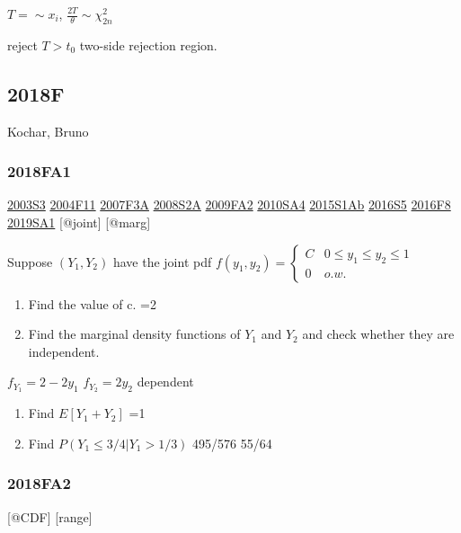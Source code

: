 \documentclass[6pt,Portrait]{article}
\begin{document}
\(T=\sim x_i\), \(\frac{2T}{\theta}\sim\chi^2_{2n}\)

reject \(T>t_0\) two-side rejection region.

\hypertarget{f-13}{%
\subsection{2018F}\label{f-13}}

Kochar, Bruno

\hypertarget{fa1-4}{%
\subsubsection{2018FA1}\label{fa1-4}}

\protect\hyperlink{s3}{2003S3} \protect\hyperlink{f11}{2004F11}
\protect\hyperlink{f3a}{2007F3A} \protect\hyperlink{s2a}{2008S2A}
\protect\hyperlink{fa2}{2009FA2} \protect\hyperlink{sa4-1}{2010SA4}
\protect\hyperlink{s1ab}{2015S1Ab} \protect\hyperlink{s5-4}{2016S5}
\protect\hyperlink{f8-4}{2016F8} \protect\hyperlink{sa1-3}{2019SA1}
{[}@joint{]} {[}@marg{]}

Suppose \((Y_1,Y_2)\) have the joint pdf
\(f(y_1,y_2)=\begin{cases}C&0\le y_1\le y_2\le 1\\0& o.w.\end{cases}\)

\begin{enumerate}
\def\labelenumi{(\alph{enumi})}
\item
  Find the value of c. =2
\item
  Find the marginal density functions of \(Y_1\) and \(Y_2\) and check
  whether they are independent.
\end{enumerate}

\(f_{Y_1}=2-2y_1\) \(f_{Y_2}=2y_2\) dependent

\begin{enumerate}
\def\labelenumi{(\alph{enumi})}
\setcounter{enumi}{2}
\item
  Find \(E[Y_1+Y_2]\) =1
\item
  Find \(P(Y_1\le3/4|Y_1>1/3)\) 495/576 55/64
\end{enumerate}

\hypertarget{fa2-4}{%
\subsubsection{2018FA2}\label{fa2-4}}

{[}@CDF{]} {[}range{]}
\end{document}
